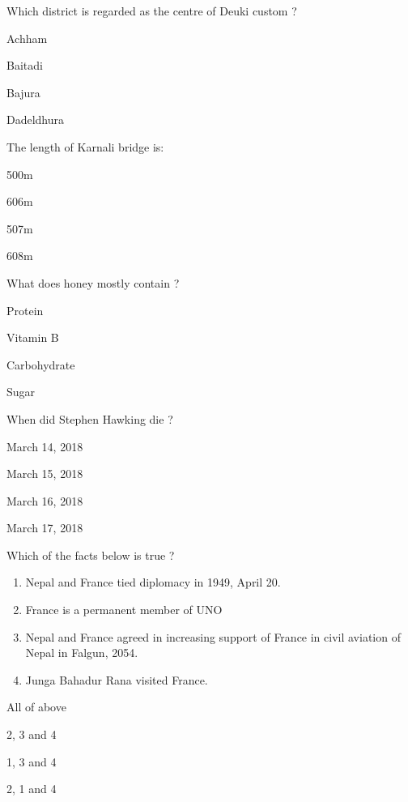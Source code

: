 \begin{questions}
\question Which district is regarded as the centre of Deuki custom ?
  \begin{items}
  \item Achham
  \item* Baitadi
  \item Bajura
  \item Dadeldhura
  \end{items}

\question The length of Karnali bridge is:
  \begin{items}
  \item* 500m
  \item 606m
  \item 507m
  \item 608m
  \end{items}

\question What does honey mostly contain ?
  \begin{items}
  \item Protein
  \item Vitamin B
  \item* Carbohydrate
  \item Sugar
  \end{items}

\question When did Stephen Hawking die ?
  \begin{items}
  \item* March 14, 2018
  \item March 15, 2018
  \item March 16, 2018
  \item March 17, 2018
  \end{items}

\question Which of the facts below is true ?
  \begin{enumerate}
  \item Nepal and France tied diplomacy in 1949, April 20.
  \item France is a permanent member of UNO
  \item Nepal and France agreed in increasing support of France in civil aviation of Nepal in Falgun, 2054.
  \item Junga Bahadur Rana visited France.
  \end{enumerate}
  \begin{items}
  \item* All of above
  \item 2, 3 and 4
  \item 1, 3 and 4
  \item 2, 1 and 4
  \end{items}


\end{questions}
